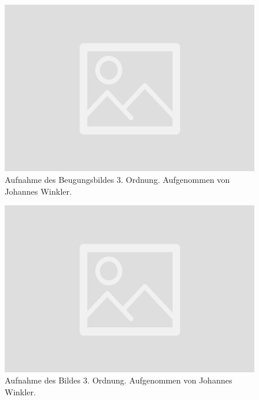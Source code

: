 \documentclass{article}
\begin{document}
\begin{minipage}[t]{.45\textwidth}
\begin{figure}[H]
\includegraphics[scale=0.1]{jw/Beugungsbild_3.jpg}
\caption{Aufnahme des Beugungsbildes 3. Ordnung. Aufgenommen von Johannes Winkler.}
\label{fig:bbild_3_jw}
\end{figure}
\end{minipage}
\hfill
\noindent
\begin{minipage}[t]{.45\textwidth}
\begin{figure}[H]
\includegraphics[scale=0.1]{jw/Bild_3.jpg}
\caption{Aufnahme des Bildes 3. Ordnung. Aufgenommen von Johannes Winkler.}\label{fig:bild_3_jw}
\end{figure}
\end{minipage}
\end{document}
